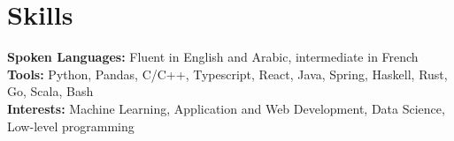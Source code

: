 \documentclass[]{article}
\begin{document}

\section{Skills}
\textbf{Spoken Languages:} Fluent in English and Arabic, intermediate in French\\
\textbf{Tools:} Python, Pandas, C/C++, Typescript, React, Java, Spring, Haskell, Rust, Go, Scala, Bash \\
\textbf{Interests:} Machine Learning, Application and Web Development, Data Science, Low-level programming
\end{document}
